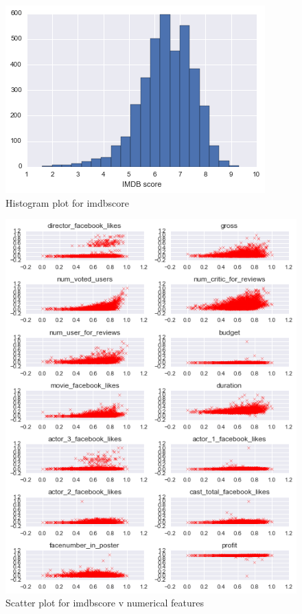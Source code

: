 \documentclass{article}%
\begin{document}
\begin{figure}
\centering
\includegraphics[width=1.0\columnwidth]{Fig/imdbhist.png}
\caption{Histogram plot for imdbscore}
\label{fig:imdbhist}
\end{figure}

\begin{figure}
\centering
\includegraphics[width=1.0\columnwidth]{Fig/ScatterPlot.png}
\caption{Scatter plot for imdbscore v numerical features}
\label{fig:scatter}
\end{figure}
\end{document}
